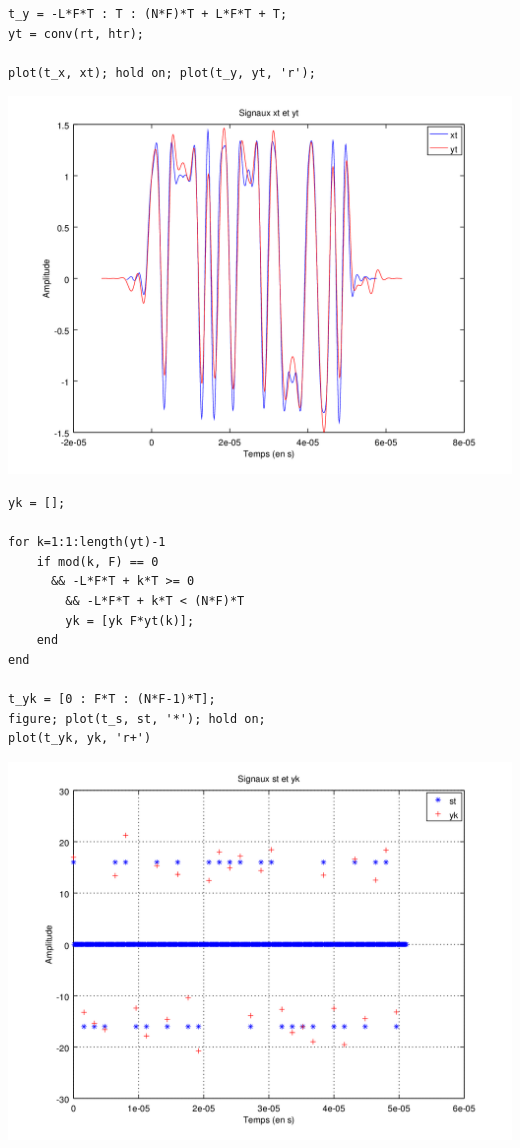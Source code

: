 \documentclass{acm_proc_article-sp}
\begin{document}
\begin{center}
\begin{lstlisting}
t_y = -L*F*T : T : (N*F)*T + L*F*T + T;
yt = conv(rt, htr);

plot(t_x, xt); hold on; plot(t_y, yt, 'r');
\end{lstlisting}

\includegraphics[scale=0.45]{yt_13.png}

\begin{lstlisting}
yk = [];

for k=1:1:length(yt)-1
    if mod(k, F) == 0 
      && -L*F*T + k*T >= 0 
        && -L*F*T + k*T < (N*F)*T
        yk = [yk F*yt(k)];
    end
end

t_yk = [0 : F*T : (N*F-1)*T];
figure; plot(t_s, st, '*'); hold on;
plot(t_yk, yk, 'r+')
\end{lstlisting}

\includegraphics[scale=0.45]{yk_13.png}
\end{center}
\end{document}
